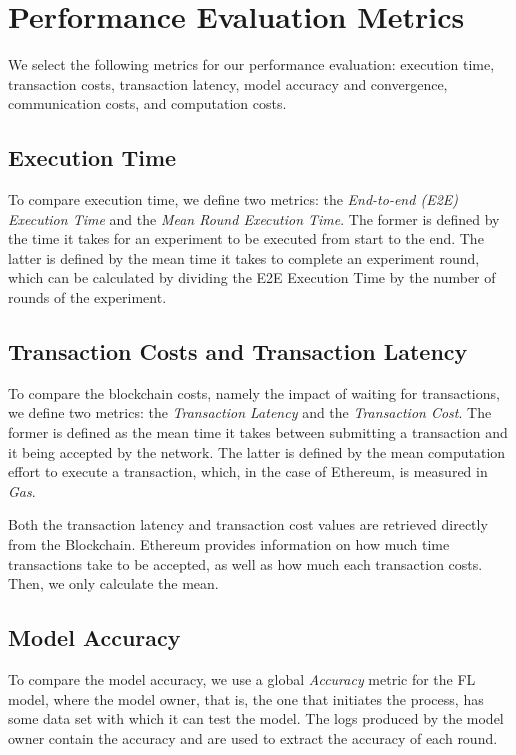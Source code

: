 \section{Performance Evaluation Metrics}\label{eval:metrics}

We select the following metrics for our performance evaluation: execution time, transaction costs, transaction latency, model accuracy and convergence, communication costs, and computation costs.

\subsection{Execution Time}

To compare execution time, we define two metrics: the \textit{End-to-end (E2E) Execution Time} and the \textit{Mean Round Execution Time}. The former is defined by the time it takes for an experiment to be executed from start to the end. The latter is defined by the mean time it takes to complete an experiment round, which can be calculated by dividing the E2E Execution Time by the number of rounds of the experiment.

\subsection{Transaction Costs and Transaction Latency}

To compare the blockchain costs, namely the impact of waiting for transactions, we define two metrics: the \textit{Transaction Latency} and the \textit{Transaction Cost}. The former is defined as the mean time it takes between submitting a transaction and it being accepted by the network. The latter is defined by the mean computation effort to execute a transaction, which, in the case of Ethereum, is measured in \textit{Gas}.

Both the transaction latency and transaction cost values are retrieved directly from the Blockchain. Ethereum provides information on how much time transactions take to be accepted, as well as how much each transaction costs. Then, we only calculate the mean.

\subsection{Model Accuracy}

To compare the model accuracy, we use a global \textit{Accuracy} metric for the FL model, where the model owner, that is, the one that initiates the process, has some data set with which it can test the model. The logs produced by the model owner contain the accuracy and are used to extract the accuracy of each round.

